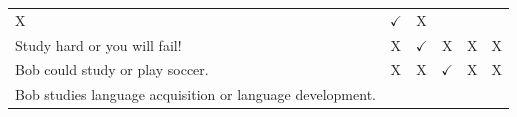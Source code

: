 \documentclass[oneside]{report}
\theoremstyle{definition}
\theoremstyle{definition}
\theoremstyle{definition}
\theoremstyle{remark}
\begin{document}
\begin{longtable}[]{@{}lccccc@{}}
\begin{minipage}[t]{0.05\columnwidth}
X\strut
\end{minipage} & \begin{minipage}[t]{0.09\columnwidth}\centering\strut
\(\checkmark\)\strut
\end{minipage} & \begin{minipage}[t]{0.12\columnwidth}\centering\strut
X\strut
\end{minipage}\tabularnewline
\begin{minipage}[t]{0.47\columnwidth}\raggedright\strut
Study hard or you will fail!\strut
\end{minipage} & \begin{minipage}[t]{0.05\columnwidth}\centering\strut
X\strut
\end{minipage} & \begin{minipage}[t]{0.05\columnwidth}\centering\strut
\(\checkmark\)\strut
\end{minipage} & \begin{minipage}[t]{0.05\columnwidth}\centering\strut
X\strut
\end{minipage} & \begin{minipage}[t]{0.09\columnwidth}\centering\strut
X\strut
\end{minipage} & \begin{minipage}[t]{0.12\columnwidth}\centering\strut
X\strut
\end{minipage}\tabularnewline
\begin{minipage}[t]{0.47\columnwidth}\raggedright\strut
Bob could study or play soccer.\strut
\end{minipage} & \begin{minipage}[t]{0.05\columnwidth}\centering\strut
X\strut
\end{minipage} & \begin{minipage}[t]{0.05\columnwidth}\centering\strut
X\strut
\end{minipage} & \begin{minipage}[t]{0.05\columnwidth}\centering\strut
\(\checkmark\)\strut
\end{minipage} & \begin{minipage}[t]{0.09\columnwidth}\centering\strut
X\strut
\end{minipage} & \begin{minipage}[t]{0.12\columnwidth}\centering\strut
X\strut
\end{minipage}\tabularnewline
\begin{minipage}[t]{0.47\columnwidth}\raggedright\strut
Bob studies language acquisition or language development.\strut
\end{minipage} & \begin{minipage}[t]{0.05\columnwidth}\centering\strut

\end{minipage}
\end{longtable}
\end{document}
